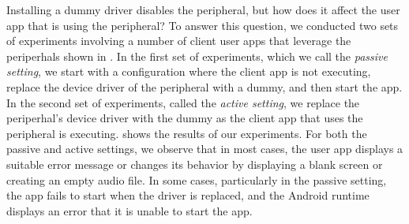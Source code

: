 Installing a dummy driver disables the peripheral, but how does it affect the
user app that is using the peripheral? To answer this question, we conducted
two sets of experiments involving a number of client user apps that leverage
the periperhals shown in . In the first set of
experiments, which we call the \textit{passive setting}, we start with a
configuration where the client app is not executing, replace the device driver
of the peripheral with a dummy, and then start the app. In the second set of
experiments, called the \textit{active setting}, we replace the periperhal's
device driver with the dummy as the client app that uses the peripheral is
executing.  shows the results of our experiments. For
both the passive and active settings, we observe that in most cases, the user
app displays a suitable error message or changes its behavior by displaying a
blank screen or creating an empty audio file. In some cases, particularly in
the passive setting, the app fails to start when the driver is replaced, and
the Android runtime displays an error that it is unable to start the app.
